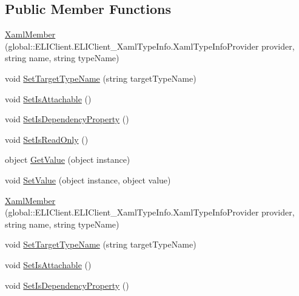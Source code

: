 \subsection*{Public Member Functions}
\begin{DoxyCompactItemize}
\item 
\hyperlink{class_e_l_i_client_1_1_e_l_i_client___xaml_type_info_1_1_xaml_member_a459e15df1bb2f1db7eb674875071d4ed}{Xaml\+Member} (global\+::\+E\+L\+I\+Client.\+E\+L\+I\+Client\+\_\+\+Xaml\+Type\+Info.\+Xaml\+Type\+Info\+Provider provider, string name, string type\+Name)
\item 
void \hyperlink{class_e_l_i_client_1_1_e_l_i_client___xaml_type_info_1_1_xaml_member_ab5cc2f3b78450d6b605fd3f0dee70c72}{Set\+Target\+Type\+Name} (string target\+Type\+Name)
\item 
void \hyperlink{class_e_l_i_client_1_1_e_l_i_client___xaml_type_info_1_1_xaml_member_affffe9d411b19464941a2032368c9709}{Set\+Is\+Attachable} ()
\item 
void \hyperlink{class_e_l_i_client_1_1_e_l_i_client___xaml_type_info_1_1_xaml_member_a6975f96aa6cb1f35ac539043b00635f6}{Set\+Is\+Dependency\+Property} ()
\item 
void \hyperlink{class_e_l_i_client_1_1_e_l_i_client___xaml_type_info_1_1_xaml_member_a4bbc6299976d7ece81eb280f524ee88e}{Set\+Is\+Read\+Only} ()
\item 
object \hyperlink{class_e_l_i_client_1_1_e_l_i_client___xaml_type_info_1_1_xaml_member_a8746f4f3591a5a6568efb4868a0d507a}{Get\+Value} (object instance)
\item 
void \hyperlink{class_e_l_i_client_1_1_e_l_i_client___xaml_type_info_1_1_xaml_member_a8a245ec3f4d3098faae8d6f261976340}{Set\+Value} (object instance, object value)
\item 
\hyperlink{class_e_l_i_client_1_1_e_l_i_client___xaml_type_info_1_1_xaml_member_a459e15df1bb2f1db7eb674875071d4ed}{Xaml\+Member} (global\+::\+E\+L\+I\+Client.\+E\+L\+I\+Client\+\_\+\+Xaml\+Type\+Info.\+Xaml\+Type\+Info\+Provider provider, string name, string type\+Name)
\item 
void \hyperlink{class_e_l_i_client_1_1_e_l_i_client___xaml_type_info_1_1_xaml_member_ab5cc2f3b78450d6b605fd3f0dee70c72}{Set\+Target\+Type\+Name} (string target\+Type\+Name)
\item 
void \hyperlink{class_e_l_i_client_1_1_e_l_i_client___xaml_type_info_1_1_xaml_member_affffe9d411b19464941a2032368c9709}{Set\+Is\+Attachable} ()
\item 
void \hyperlink{class_e_l_i_client_1_1_e_l_i_client___xaml_type_info_1_1_xaml_member_a6975f96aa6cb1f35ac539043b00635f6}{Set\+Is\+Dependency\+Property} ()

\end{DoxyCompactItemize}
